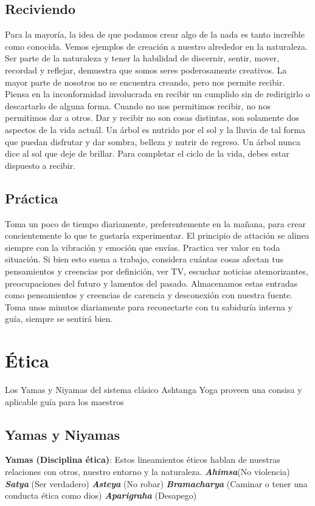 \subsection{Reciviendo}
Para la mayoría, la idea de que podamos crear algo de la nada es tanto increíble como conocida. Vemos ejemplos de creación a nuestro alrededor en la naturaleza. Ser parte de la naturaleza y tener la habilidad de discernir, sentir, mover, recordad y reflejar, demuestra que somos seres poderosamente creativos. La mayor parte de nosotros no se encuentra creando, pero nos permite recibir. Piensa en la inconformidad involucrada en recibir un cumplido sin de redirigirlo o descartarlo de alguna forma. Cuando no nos permitimos recibir, no nos permitimos dar a otros. Dar y recibir no son cosas distintas, son solamente dos aspectos de la vida actuál. Un árbol es nutrido por el sol y la lluvia de tal forma que puedan disfrutar y dar sombra, belleza y nutrir de regreso. Un árbol nunca dice al sol que deje de brillar. Para completar el ciclo de la vida, debes estar dispuesto a recibir.

\subsection{Práctica}
Toma un poco de tiempo diariamente, preferentemente en la mañana, para crear concientemente lo que te gustaría experimentar. El principio de attación se alinea siempre con la vibración y emoción que envías. Practica ver valor en toda situación. Si bien esto suena a trabajo, considera cuántas cosas afectan tus pensamientos y creencias por definición, ver TV, escuchar noticias atemorizantes, preocupaciones del futuro y lamentos del pasado. Almacenamos estas entradas como pensamientos y creencias de carencia y desconexión con nuestra fuente. Toma unos minutos diariamente para reconectarte con tu sabiduría interna y guía, siempre se sentirá bien.

\section{Ética}
Los Yamas y Niyamas del sistema clásico Ashtanga Yoga proveen una consisa y aplicable guía para los maestros

\subsection{Yamas y Niyamas}
\textbf{Yamas (Disciplina \'etica)}: Estos lineamientos \'eticos hablan de nuestras relaciones con otros, nuestro entorno y la naturaleza.
\textbf{\textit{Ahimsa}}(No violencia)
\textbf{\textit{Satya}} (Ser verdadero)
\textbf{\textit{Asteya}} (No robar)
\textbf{\textit{Bramacharya}} (Caminar o tener una conducta \'etica como dios)
\textbf{\textit{Aparigraha}} (Desapego)

